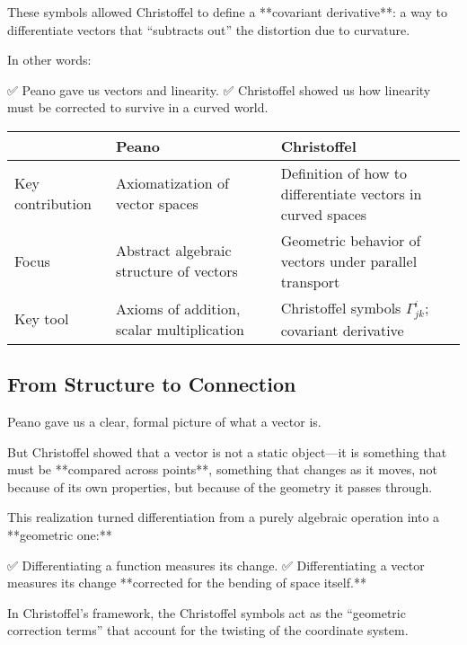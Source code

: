 These symbols allowed Christoffel to define a **covariant derivative**:  
a way to differentiate vectors that “subtracts out” the distortion due to curvature.

In other words:

✅ Peano gave us vectors and linearity.  
✅ Christoffel showed us how linearity must be corrected to survive in a curved world.

\bigskip

\begin{tcolorbox}[colback=gray!5!white, colframe=black, title=\textbf{Sidebar: The Shift from Peano to Christoffel}, fonttitle=\bfseries, arc=1.5mm, boxrule=0.4pt]

\begin{tabular}{>{\raggedright}p{4cm} >{\raggedright}p{5.5cm} >{\raggedright\arraybackslash}p{5.5cm}}
 & \textbf{Peano} & \textbf{Christoffel} \\
\midrule
Key contribution & Axiomatization of vector spaces & Definition of how to differentiate vectors in curved spaces \\
Focus & Abstract algebraic structure of vectors & Geometric behavior of vectors under parallel transport \\
Key tool & Axioms of addition, scalar multiplication & Christoffel symbols \( \Gamma^i_{jk} \); covariant derivative
\end{tabular}

\end{tcolorbox}

\bigskip

\subsection*{From Structure to Connection}

Peano gave us a clear, formal picture of what a vector is.

But Christoffel showed that a vector is not a static object—it is something that must be **compared across points**,  
something that changes as it moves, not because of its own properties, but because of the geometry it passes through.

This realization turned differentiation from a purely algebraic operation into a **geometric one:**

✅ Differentiating a function measures its change.  
✅ Differentiating a vector measures its change **corrected for the bending of space itself.**

In Christoffel’s framework, the Christoffel symbols act as the “geometric correction terms” that account for the twisting of the coordinate system.

